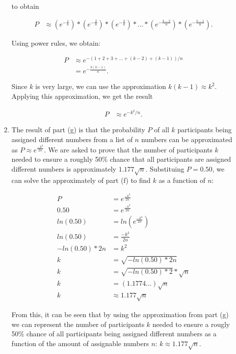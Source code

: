 \documentclass[11pt]{article}
\theoremstyle{definition}
\begin{document}
\begin{enumerate}
\begin{enumerate}
to obtain

\begin{align*}
P &\approx (e^{-\frac{1}{n}}) * (e^{-\frac{2}{n}}) * (e^{-\frac{3}{n}}) * \ldots * (e^{-\frac{k-2}{n}}) * (e^{-\frac{k-1}{n}}).
\end{align*}

Using power rules, we obtain:

\begin{align*}
P &\approx e^{-(1 + 2 + 3 + \ldots + (k - 2) + (k - 1)) / n}\\
&= e^{-\frac{k (k - 1)}{n}}.
\end{align*}

Since $k$ is very large, we can use the approximation $k (k - 1) \approx k^2$. Applying this approximation, we get the result

\begin{align*}
P &\approx e^{-k^2 / n}.
\end{align*}

\item The result of part (g) is that the probability $P$ of all $k$ participants being assigned different numbers from a list of $n$ numbers can be approximated as $P \approx e^{\frac{-k^2}{2n}}$. We are asked
to prove that the number of participants $k$ needed to ensure a roughly 50\% chance that all participants are assigned different numbers is approximately $1.177 \sqrt{n}$. Substituing $P = 0.50$, we can solve
the approximately of part (f) to find $k$ as a function of $n$:

\begin{align*}
P &=  e^{\frac{-k^2}{2n}}\\
0.50 &=  e^{\frac{-k^2}{2n}}\\
ln(0.50) &= ln( e^{\frac{-k^2}{2n}})\\
ln(0.50) &=  \frac{-k^2}{2n}\\
-ln(0.50) * 2n &= k^2\\
k  &= \sqrt{-ln(0.50) * 2n}\\
k &= \sqrt{-ln(0.50) * 2} * \sqrt{n}\\
k &= (1.1774 \ldots) \sqrt{n}\\
k &\approx 1.177 \sqrt{n}
\end{align*}

From this, it can be seen that by using the approximation from part (g) we can represent the number of participants $k$ needed to ensure a rougly 50\% chance of all participants being assigned different numbers
as a function of the amount of assignable numbers $n$: $k \approx 1.177 \sqrt{n}$.


\end{enumerate}
\end{enumerate}
\end{document}
